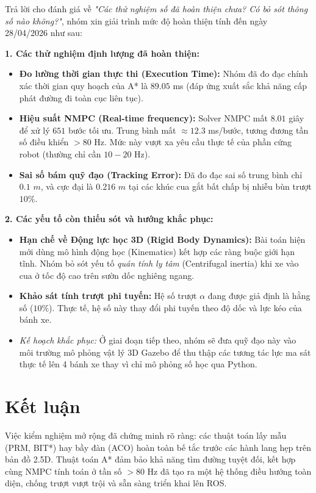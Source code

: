 \documentclass[12pt, a4paper]{article}
\begin{document}
Trả lời cho đánh giá về \textit{"Các thử nghiệm số đã hoàn thiện chưa? Có bỏ sót thông số nào không?"}, nhóm xin giải trình mức độ hoàn thiện tính đến ngày 28/04/2026 như sau:

\textbf{1. Các thử nghiệm định lượng đã hoàn thiện:}
\begin{itemize}
    \item \textbf{Đo lường thời gian thực thi (Execution Time):} Nhóm đã đo đạc chính xác thời gian quy hoạch của A* là $89.05$ ms (đáp ứng xuất sắc khả năng cấp phát đường đi toàn cục liên tục).
    \item \textbf{Hiệu suất NMPC (Real-time frequency):} Solver NMPC mất $8.01$ giây để xử lý $651$ bước tối ưu. Trung bình mất $\approx 12.3$ ms/bước, tương đương tần số điều khiển $> 80$ Hz. Mức này vượt xa yêu cầu thực tế của phần cứng robot (thường chỉ cần $10-20$ Hz).
    \item \textbf{Sai số bám quỹ đạo (Tracking Error):} Đã đo đạc sai số trung bình chỉ $0.1$ $m$, và cực đại là $0.216$ $m$ tại các khúc cua gắt bất chấp bị nhiễu bùn trượt $10\%$.
\end{itemize}

\textbf{2. Các yếu tố còn thiếu sót và hướng khắc phục:}
\begin{itemize}
    \item \textbf{Hạn chế về Động lực học 3D (Rigid Body Dynamics):} Bài toán hiện mới dùng mô hình động học (Kinematics) kết hợp các ràng buộc giới hạn tĩnh. Nhóm bỏ sót yếu tố \textit{quán tính ly tâm} (Centrifugal inertia) khi xe vào cua ở tốc độ cao trên sườn dốc nghiêng ngang. 
    \item \textbf{Khảo sát tính trượt phi tuyến:} Hệ số trượt $\alpha$ đang được giả định là hằng số ($10\%$). Thực tế, hệ số này thay đổi phi tuyến theo độ dốc và lực kéo của bánh xe.
    \item \textit{Kế hoạch khắc phục:} Ở giai đoạn tiếp theo, nhóm sẽ đưa quỹ đạo này vào môi trường mô phỏng vật lý 3D Gazebo để thu thập các tương tác lực ma sát thực tế lên 4 bánh xe thay vì chỉ mô phỏng số học qua Python.
\end{itemize}

\section{Kết luận}
Việc kiểm nghiệm mở rộng đã chứng minh rõ ràng: các thuật toán lấy mẫu (PRM, BIT*) hay bầy đàn (ACO) hoàn toàn bế tắc trước các hành lang hẹp trên bản đồ 2.5D. Thuật toán A* đảm bảo khả năng tìm đường tuyệt đối, kết hợp cùng NMPC tính toán ở tần số $>80$ Hz đã tạo ra một hệ thống điều hướng toàn diện, chống trượt vượt trội và sẵn sàng triển khai lên ROS.
\end{document}
